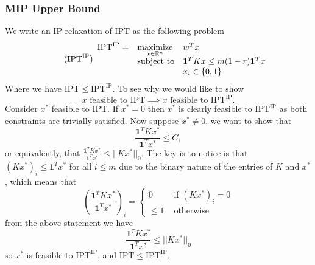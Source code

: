 \documentclass[12pt]{article}
\newcommand{\priv}{\text{IPT}}
\newcommand{\privuip}{\text{IPT}^\text{IP}}
\begin{document}
\subsubsection{\gls{MIP} Upper Bound}
We write an IP relaxation of \gls{IPT} as the following problem
\begin{equation}
	\label{eq:privuip} 
    \tag{$\privuip$} 
	\begin{array}{lll}
		\privuip = & \underset{x\in\mr^n}{\text{maximize}} & w^T x \\
		& \mbox{subject to} & \mathbf{1}^TKx \leq m(1-r)\mathbf{1}^Tx \\
        && x_i \in \{0,1\}
		\end{array}
\end{equation}
Where we have $\priv \leq \privuip$. To see why we would like to show
\[x \text{ feasible to } \priv \implies x \text{ feasible to } \privuip.\]
Consider $x^*$ feasible to $\priv$. If $x^* =0$ then $x^*$ is clearly feasible to $\privuip$ as both constraints are trivially satisfied. Now suppose $x^*\neq 0$, we want to show that \[\frac{\mathbf{1}^TKx^*}{\mathbf{1}^Tx^*} \leq C,\] or equivalently, that $\frac{\mathbf{1}^TKx^*}{\mathbf{1}^Tx^*} \leq ||Kx^*||_0$. The key is to notice is that $(Kx^*)_i \leq \mathbf{1}^Tx^*$ for all $i\leq m$ due to the binary nature of the entries of $K$ and $x^*$, which means that 
\[\left(\frac{\mathbf{1}^TKx^*}{\mathbf{1}^Tx^*}\right)_i = 
\begin{cases}
    0 & \text{ if } (Kx^*)_i = 0 \\
    \leq 1 & \text{ otherwise}
\end{cases}
\]
from the above statement we have
\[\frac{\mathbf{1}^TKx^*}{\mathbf{1}^Tx^*} \leq ||Kx^*||_0\]
so $x^*$ is feasible to $\privuip$, and $\priv \leq \privuip$.
\end{document}
